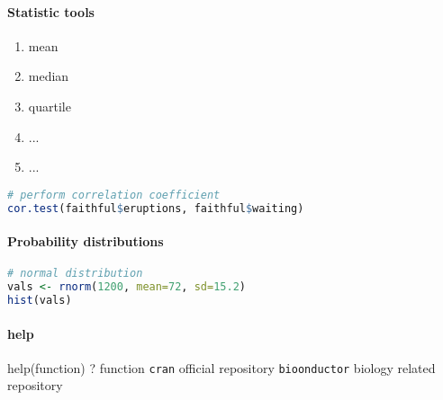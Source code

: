 \documentclass[11pt]{article}
\begin{document}
\paragraph{Statistic tools} %
\label{par:statistic_tools}
\begin{enumerate}
	\item mean
	\item median	
	\item quartile
	\item ...
	\item ...
\end{enumerate}

\begin{lstlisting}[language=R]
# perform correlation coefficient
cor.test(faithful$eruptions, faithful$waiting)
\end{lstlisting}

\paragraph{Probability distributions} %
\label{par:probability_distributions}
\begin{lstlisting}[language=R]
# normal distribution
vals <- rnorm(1200, mean=72, sd=15.2)
hist(vals)
\end{lstlisting}







\paragraph{help} %
\label{par:help}
help(function)
? function
\texttt{cran} official repository
\texttt{bioonductor} biology related repository
\end{document}
